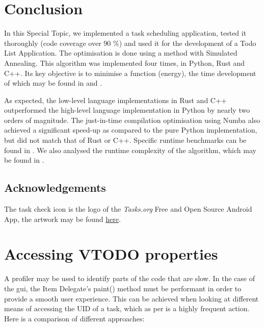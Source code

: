 \documentclass{prettytex/ox/mmsc-special-topic}
\begin{document}
  \pagebreak
  \pagestyle{normal}

  
  
  
  
  
  

  \section{Conclusion}
  In this Special Topic, we implemented a task scheduling application, tested it thoroughly (code coverage over 90 \%) and used it for the development of a Todo List Application.
  The optimisation is done using a  method with Simulated Annealing.
  This algorithm was implemented four times, in Python, Rust and C++.
  Its key objective is to minimise a function (energy), the time development of which may be found in  and .

  As expected, the low-level language implementations in Rust and C++ outperformed the high-level language implementation in Python by nearly two orders of magnitude.
  The just-in-time compilation optimisation using Numba also achieved a significant speed-up as compared to the pure Python implementation, but did not match that of Rust or C++.
  Specific runtime benchmarks can be found in .
  We also analysed the runtime complexity of the algorithm, which may be found in .

  \subsection{Acknowledgements}
  The task check icon is the logo of the \textit{Tasks.org} Free and Open Source Android App, the artwork may be found \href{https://github.com/tasks/tasks/tree/main/graphics}{here}.

  \pagebreak
  \printbibliography
  \printnoidxglossary[type=acronym]

  \appendix
  \section{Accessing VTODO properties}
  A profiler may be used to identify parts of the code that are slow.
  In the case of the \gls{gui}, the Item Delegate's paint() method must be performant in order to provide a smooth user experience.
  This can be achieved when looking at different means of accessing the UID of a task, which as per  is a highly frequent action.
  Here is a comparison of different approaches:
\end{document}
